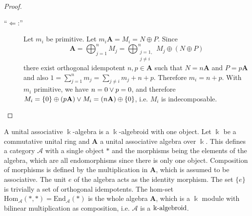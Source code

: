 \begin{proof}[Proof\nopunct]
\begin{subproof}
\begin{description}
\item[``$\Leftarrow$:''] Let $m_{i}$ be primitive. Let $m_{i}\mathbf{A} = M_{i} = N \oplus P$. Since
\[
\mathbf{A} = \bigoplus_{j=1}^{n} M_{j} = \bigoplus_{\begin{smallmatrix}j=1,\\ j \neq i\end{smallmatrix}}^{n} M_{j} \oplus (N \oplus P)
\]
there exist orthogonal idempotent $n, p \in \mathbf{A}$ such that $N = n\mathbf{A}$ and $P = p\mathbf{A}$ and also
$1 = \sum_{j=1}^{n} m_{j} = \sum_{j\neq i} m_{j} + n + p$. Therefore $m_{i} = n + p$. With $m_{i}$ primitive, we have
$n = 0 \vee p = 0$, and therefore $M_{i} = \{0\} \oplus (p\mathbf{A}) \vee M_{i} = (n\mathbf{A}) \oplus \{0\}$, i.e. $M_{i}$ is indecomposable.
\end{description}
\end{subproof}
\end{proof}

A unital associative $\Bbbk$-algebra is a $\Bbbk$-algebroid with one object.
Let $\Bbbk$ be a commutative unital ring and $\mathbf{A}$ a unital associative algebra over $\Bbbk$. This defines a category $\mathcal{A}$
with a single object $\ast$ and the morphisms being the elements of the algebra, which are all endomorphisms since there is only one object.
Composition of morphisms is defined by the multiplication in $\mathbf{A}$, which is assumed to be associative.
The unit $e$ of the algebra acts as the identity morphism. The set $\{ e \}$ is trivially a set of orthogonal idempotents.
The hom-set $\mathrm{Hom}_{\mathcal{A}}(\ast,\ast) = \mathrm{End}_{\mathcal{A}}(\ast)$ is the whole algebra $\mathbf{A}$, which is
a $\Bbbk$ module with bilinear multiplication as composition, i.e. $\mathcal{A}$ is a $\Bbbk\textnormal{-}\mathrm{algebroid}$.

